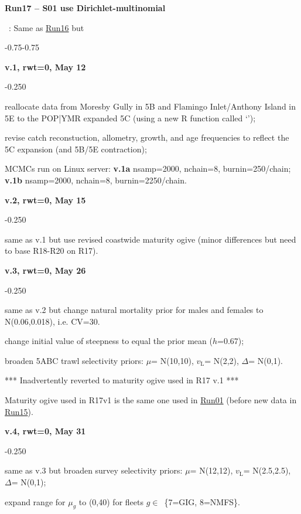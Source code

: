 \hypertarget{R17}{\textbf{Run17 -- S01 use Dirichlet-multinomial}}~: Same as \hyperlink{R16}{Run16} but
\begin{itemize_csas}{-0.75}{-0.75}
	\item \textbf{v.1, rwt=0, May 12}
	\begin{itemize_csas}{-0.25}{0}
		\item reallocate data from Moresby Gully in 5B and Flamingo Inlet/Anthony Island in 5E to the POP|YMR expanded 5C (using a new R function called `');
		\item revise catch reconstuction, allometry, growth, and age frequencies to reflect the 5C expansion (and 5B/5E contraction);
		\item MCMCs run on Linux server: \textbf{v.1a} nsamp=2000, nchain=8, burnin=250/chain; \textbf{v.1b} nsamp=2000, nchain=8, burnin=2250/chain.
	\end{itemize_csas}
	\item \textbf{v.2, rwt=0, May 15}
	\begin{itemize_csas}{-0.25}{0}
		\item same as v.1 but use revised coastwide maturity ogive (minor differences but need to base R18-R20 on R17).
	\end{itemize_csas}
	\item \textbf{v.3, rwt=0, May 26}
	\begin{itemize_csas}{-0.25}{0}
		\item same as v.2 but change natural mortality prior for males and females to N(0.06,0.018), i.e. CV=30\pc{}.
		\item change initial value of steepness to equal the prior mean ($h$=0.67);
		\item broaden 5ABC trawl selectivity priors: $\mu$= N(10,10), $v_\text{L}$= N(2,2), $\Delta$= N(0,1).
		\item \alert{*** Inadvertently reverted to maturity ogive used in R17 v.1 ***}
		\item \alert{Maturity ogive used in R17v1 is the same one used in \hyperlink{R01}{Run01} (before new data in \hyperlink{R15}{Run15}}).
	\end{itemize_csas}
	\item \textbf{v.4, rwt=0, May 31}
	\begin{itemize_csas}{-0.25}{0}
		\item same as v.3 but broaden survey selectivity priors: $\mu$= N(12,12), $v_\text{L}$= N(2.5,2.5), $\Delta$= N(0,1);
		\item expand range for $\mu_g$ to (0,40) for fleets $g\in$~\{7=GIG, 8=NMFS\}.

\end{itemize_csas}
\end{itemize_csas}
